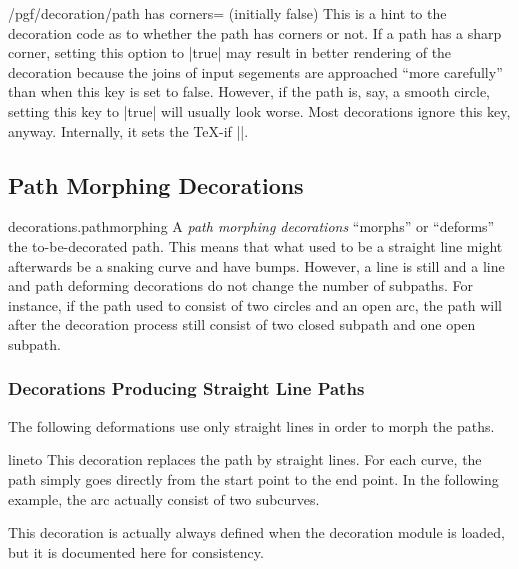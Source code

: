 \begin{key}{/pgf/decoration/path has corners= (initially false)}
  This is a hint to the decoration code as to whether the path has
  corners or not. If a path has a sharp corner, setting this option to
  |true| may result in better rendering of the decoration because the
  joins of input segements are approached ``more carefully'' than
  when this key is set to false. However, if the path is, say, a
  smooth circle, setting this key to |true| will usually look
  worse. Most decorations ignore this key, anyway. Internally, it sets
  the \TeX-if |\ifpgfdecoratepathhascorners|.
\end{key}


\subsection{Path Morphing Decorations}

\begin{pgflibrary}{decorations.pathmorphing}
  A \emph{path morphing decorations} ``morphs'' or ``deforms'' the
  to-be-decorated path. This means that what used to be a straight
  line might afterwards be a snaking curve and have bumps. However, a
  line is still and a line and path deforming decorations do not
  change the number of subpaths. For instance, if the path used to
  consist of two circles and an open arc, the path will after the
  decoration process still consist of two closed subpath and one open
  subpath. 
\end{pgflibrary}


\subsubsection{Decorations Producing Straight Line Paths}

The following deformations use only straight lines in order to morph
the paths.

\begin{decoration}{lineto}
  This decoration replaces the path by straight lines. For each curve,
  the path simply goes directly from the start point to the end point.
  In the following example, the arc actually consist of two
  subcurves.

  This decoration is actually always defined when the decoration
  module is loaded, but it is documented here for consistency.
\begin{codeexample}[]
\end{codeexample}
\end{decoration}


